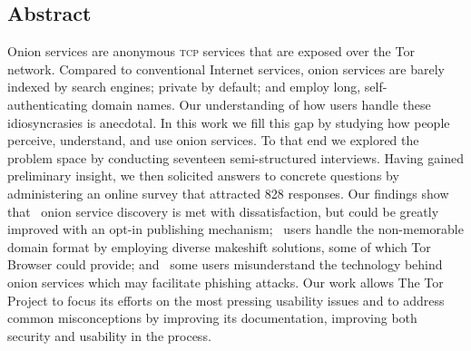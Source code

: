 \subsection*{Abstract}
Onion services are anonymous \textsc{tcp} services that are exposed over the Tor
network.  Compared to conventional Internet services, onion services are barely
indexed by search engines; private by default; and employ long,
self-authenticating domain names.  Our understanding of how users handle these
idiosyncrasies is anecdotal.
In this work we fill this gap by studying how people perceive, understand, and
use onion services.  To that end we explored the problem space by conducting
seventeen semi-structured interviews.  Having gained preliminary insight, we
then solicited answers to concrete questions by administering an online survey
that attracted 828 responses.  Our findings show that \first~onion service
discovery is met with dissatisfaction, but could be greatly improved with an
opt-in publishing mechanism; \second~users handle the non-memorable domain
format by employing diverse makeshift solutions, some of which Tor Browser could
provide; and \third~some users misunderstand the technology behind onion
services which may facilitate phishing attacks.
Our work allows The Tor Project to focus its efforts on the most pressing
usability issues and to address common misconceptions by improving its
documentation, improving both security and usability in the process.
